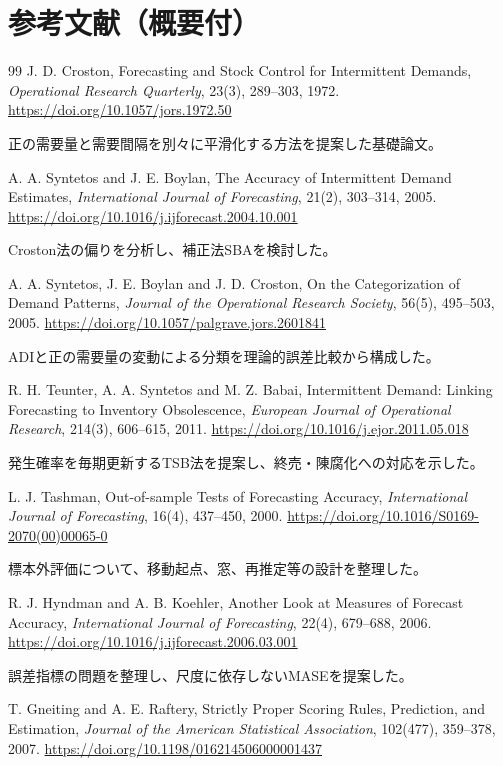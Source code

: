 \documentclass[a4paper,11pt]{jsarticle}
\begin{document}
\section{参考文献（概要付）}
\begin{thebibliography}{99}
 J. D. Croston, Forecasting and Stock Control for Intermittent Demands,
\textit{Operational Research Quarterly}, 23(3), 289--303, 1972.
\url{https://doi.org/10.1057/jors.1972.50}

正の需要量と需要間隔を別々に平滑化する方法を提案した基礎論文。

 A. A. Syntetos and J. E. Boylan, The Accuracy of Intermittent Demand Estimates,
\textit{International Journal of Forecasting}, 21(2), 303--314, 2005.
\url{https://doi.org/10.1016/j.ijforecast.2004.10.001}

Croston法の偏りを分析し、補正法SBAを検討した。

 A. A. Syntetos, J. E. Boylan and J. D. Croston,
On the Categorization of Demand Patterns,
\textit{Journal of the Operational Research Society}, 56(5), 495--503, 2005.
\url{https://doi.org/10.1057/palgrave.jors.2601841}

ADIと正の需要量の変動による分類を理論的誤差比較から構成した。

 R. H. Teunter, A. A. Syntetos and M. Z. Babai,
Intermittent Demand: Linking Forecasting to Inventory Obsolescence,
\textit{European Journal of Operational Research}, 214(3), 606--615, 2011.
\url{https://doi.org/10.1016/j.ejor.2011.05.018}

発生確率を毎期更新するTSB法を提案し、終売・陳腐化への対応を示した。

 L. J. Tashman, Out-of-sample Tests of Forecasting Accuracy,
\textit{International Journal of Forecasting}, 16(4), 437--450, 2000.
\url{https://doi.org/10.1016/S0169-2070(00)00065-0}

標本外評価について、移動起点、窓、再推定等の設計を整理した。

 R. J. Hyndman and A. B. Koehler, Another Look at Measures of Forecast Accuracy,
\textit{International Journal of Forecasting}, 22(4), 679--688, 2006.
\url{https://doi.org/10.1016/j.ijforecast.2006.03.001}

誤差指標の問題を整理し、尺度に依存しないMASEを提案した。

 T. Gneiting and A. E. Raftery, Strictly Proper Scoring Rules, Prediction, and Estimation,
\textit{Journal of the American Statistical Association}, 102(477), 359--378, 2007.
\url{https://doi.org/10.1198/016214506000001437}


\end{thebibliography}
\end{document}
